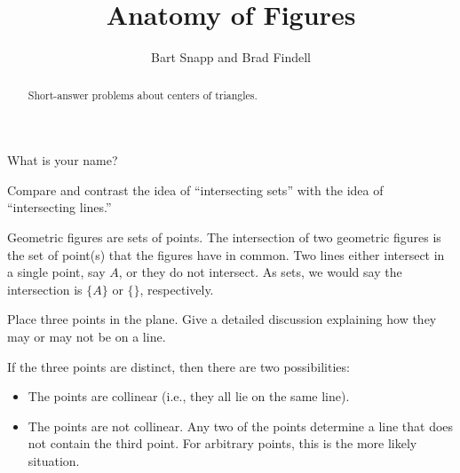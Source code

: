 \documentclass[nooutcomes]{ximera}
\title{Anatomy of Figures}
\author{Bart Snapp and Brad Findell}
\begin{document}
\begin{abstract}
Short-answer problems about centers of triangles. 
\end{abstract}
\maketitle

\begin{question}
What is your name?
\begin{freeResponse}
\end{freeResponse}
\end{question}



\begin{problem}
Compare and contrast the idea of ``intersecting sets'' with the
  idea of ``intersecting lines.''
\begin{freeResponse}
\begin{hint}
Geometric figures are sets of points.  The intersection of two geometric figures is the set of point(s) that the figures have in common.  Two lines either intersect in a single point, say $A$, or they do not intersect.  As sets, we would say the intersection is $\{A\}$ or $\{\}$, respectively. 
\end{hint}
\end{freeResponse}
\end{problem}

\begin{problem}
Place three points in the plane. Give a detailed discussion
  explaining how they may or may not be on a line.
\begin{freeResponse}
\begin{hint}
If the three points are distinct, then there are two possibilities:
\begin{itemize}
\item The points are collinear (i.e., they all lie on the same line). 
\item The points are not collinear.  Any two of the points determine a line that does not contain the third point.  For arbitrary points, this is the more likely situation.
\end{itemize}
\end{hint}
\end{freeResponse}
\end{problem}
\end{document}
